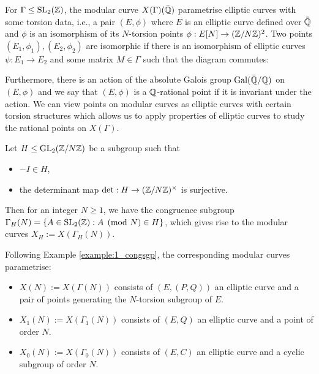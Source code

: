 For $\Gamma \leq \operatorname{SL}_2(\mathbb{Z})$, the modular curve $X(\Gamma)(\bar{\mathbb{Q}})$ parametrise elliptic curves with some torsion data, i.e., a pair $(E, \phi)$ where $E$ is an elliptic curve defined over $\bar{\mathbb{Q}}$ and $\phi$ is an isomorphism of its $N$-torsion points $\phi: E[N] \rightarrow (\mathbb{Z}/N\mathbb{Z})^2$. Two points $(E_1,\phi_1), (E_2,\phi_2)$ are isomorphic if there is an isomorphism of elliptic curves $\psi: E_1 \rightarrow E_2$ and some matrix $M \in \Gamma$ such that the diagram commutes:

\begin{center}
\end{center}


Furthermore, there is an action of the absolute Galois group $\operatorname{Gal}(\bar{\mathbb{Q}}/\mathbb{Q})$ on $(E,\phi)$ and we say that $(E,\phi)$ is a $\mathbb{Q}$-rational point if it is invariant under the action. We can view points on modular curves as elliptic curves with certain torsion structures which allows us to apply properties of elliptic curves to study the rational points on $X(\Gamma)$.

\begin{example}
Let $H \leq \operatorname{GL}_2(\mathbb{Z}/N\mathbb{Z})$ be a subgroup such that
\begin{itemize}
    \item $-I \in H$,
    \item the determinant map $\det: H \rightarrow (\mathbb{Z}/N\mathbb{Z})^\times$ is surjective.
\end{itemize}
Then for an integer $N \geq 1$, we have the congruence subgroup $\Gamma_H(N) = \{ A \in \operatorname{SL}_2(\mathbb{Z}) : A \pmod{N} \in H \}$, which gives rise to the modular curves $X_H := X(\Gamma_H(N))$.

Following Example \ref{example:1_congsgp}, the corresponding modular curves parametrise:

\begin{itemize}
    \item $X(N):= X(\Gamma(N))$ consists of $(E,(P,Q))$ an elliptic curve and a pair of points generating the $N$-torsion subgroup of $E$.
    \item $X_1(N) := X(\Gamma_1(N))$ consists of $(E,Q)$ an elliptic curve and a point of order $N$.
    \item $X_0(N) := X(\Gamma_0(N))$ consists of $(E,C)$ an elliptic curve and a cyclic subgroup of order $N$.
\end{itemize}
\end{example}

